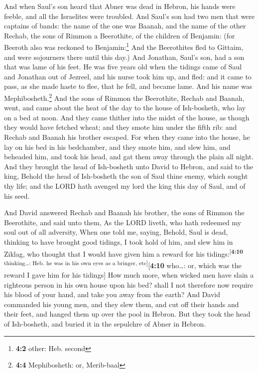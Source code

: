  And when Saul's son heard that Abner was dead in Hebron,
his hands were feeble, and all the Israelites were troubled.
 And Saul's son had two men that were captains of bands:
the name of the one was Baanah, and the name of the other Rechab, the
sons of Rimmon a Beerothite, of the children of Benjamin: (for Beeroth
also was reckoned to Benjamin:\footnote{\textbf{4:2} other: Heb. second}
 And the Beerothites fled to Gittaim, and were sojourners
there until this day.)  And Jonathan, Saul's son, had a
son that was lame of his feet. He was five years old when the tidings
came of Saul and Jonathan out of Jezreel, and his nurse took him up, and
fled: and it came to pass, as she made haste to flee, that he fell, and
became lame. And his name was Mephibosheth.\footnote{\textbf{4:4}
  Mephibosheth: or, Merib-baal}  And the sons of Rimmon
the Beerothite, Rechab and Baanah, went, and came about the heat of the
day to the house of Ish-bosheth, who lay on a bed at noon.
 And they came thither into the midst of the house, as
though they would have fetched wheat; and they smote him under the fifth
rib: and Rechab and Baanah his brother escaped.  For when
they came into the house, he lay on his bed in his bedchamber, and they
smote him, and slew him, and beheaded him, and took his head, and gat
them away through the plain all night.  And they brought
the head of Ish-bosheth unto David to Hebron, and said to the king,
Behold the head of Ish-bosheth the son of Saul thine enemy, which sought
thy life; and the LORD hath avenged my lord the king this day of Saul,
and of his seed.

 And David answered Rechab and Baanah his brother, the
sons of Rimmon the Beerothite, and said unto them, As the LORD liveth,
who hath redeemed my soul out of all adversity,  When one
told me, saying, Behold, Saul is dead, thinking to have brought good
tidings, I took hold of him, and slew him in Ziklag, who thought that I
would have given him a reward for his
tidings:\textsuperscript{{[}\textbf{4:10} thinking\ldots: Heb. he was in
his own eyes as a bringer, etc{]}}{[}\textbf{4:10} who\ldots: or, which
was the reward I gave him for his tidings{]}  How much
more, when wicked men have slain a righteous person in his own house
upon his bed? shall I not therefore now require his blood of your hand,
and take you away from the earth?  And David commanded
his young men, and they slew them, and cut off their hands and their
feet, and hanged them up over the pool in Hebron. But they took the head
of Ish-bosheth, and buried it in the sepulchre of Abner in Hebron.

